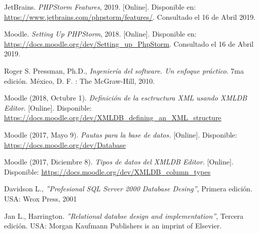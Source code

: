 \begin{thebibliography}{9}
        JetBrains. {\it PHPStorm Features}, 2019. [Online]. Disponible en: \url{https://www.jetbrains.com/phpstorm/features/}. Consultado el 16 de Abril 2019.
    
        Moodle. {\it Setting Up PHPStorm}, 2018. [Online]. Disponible en: \url{https://docs.moodle.org/dev/Setting_up_PhpStorm}. Consultado el 16 de Abril 2019.
    
        Roger S. Pressman, Ph.D., \textit{Ingeniería del software. Un enfoque práctico}. 7ma edición. México, D. F. : The McGraw-Hill, 2010. 
    
         Moodle  (2018, Octubre 1).\textit{ Definición de la esctructura XML usando XMLDB Editor}.  [Online]. Disponible: \url{ https://docs.moodle.org/dev/XMLDB_defining_an_XML_structure}   
     
     
          Moodle (2017, Mayo 9). \textit{Pautas para la base de datos.} [Online]. Disponible: \url{https://docs.moodle.org/dev/Database}
    
        Moodle  (2017, Diciembre 8). \textit{Tipos de datos del XMLDB Editor.} [Online]. Disponible: \url{https://docs.moodle.org/dev/XMLDB_column_types}
  
        Davidson L., \textit{''Profesional SQL Server 2000 Database Desing''}, Primera edición. USA: Wrox Press, 2001
  
        Jan L., Harrington. \textit{''Relational databse design and implementation''}, Tercera edición. USA: Morgan Kaufmann Publishers is an imprint of Elsevier. 
   
\begin{comment}
    
     
    \bibitem{objetivo2}
        B. Marín, J. Frez, J. Cruz-Lemus, and M. Genero. 2018.
        \textit{An Empirical Investigation on the Benefits of Gamification in Programming Courses.} ACM Trans. Comput. Educ. 19, 1, Article 4 (November 2018), 22 pages.
    

\end{comment}
\end{thebibliography}
